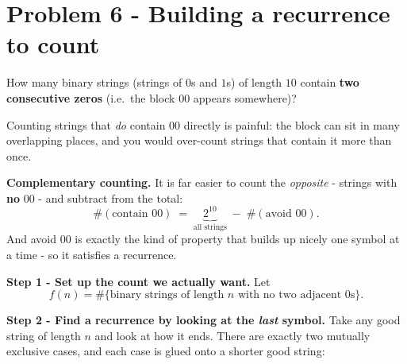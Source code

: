 \documentclass[11pt,a4paper]{article}
\begin{document}
\section*{Problem 6 - Building a recurrence to count}

\begin{problembox}[6]
How many binary strings (strings of $0$s and $1$s) of length $10$ contain
\textbf{two consecutive zeros} (i.e.\ the block \textquotedbl{}$00$\textquotedbl{} appears somewhere)?
\end{problembox}

\begin{ideabox}
Counting strings that \emph{do} contain \textquotedbl{}$00$\textquotedbl{} directly is painful: the block can sit in
many overlapping places, and you would over-count strings that contain it more than once.

\textbf{Complementary counting.} It is far easier to count the \emph{opposite} -
strings with \textbf{no} \textquotedbl{}$00$\textquotedbl{} - and subtract from the total:
\[
\#(\text{contain }00) \;=\; \underbrace{2^{10}}_{\text{all strings}} \;-\; \#(\text{avoid }00).
\]
And \textquotedbl{}avoid $00$\textquotedbl{} is exactly the kind of property that builds up nicely one symbol at a
time - so it satisfies a recurrence.
\end{ideabox}

\textbf{Step 1 - Set up the count we actually want.}
Let
\[
f(n) = \#\{\text{binary strings of length } n \text{ with no two adjacent } 0\text{s}\}.
\]

\textbf{Step 2 - Find a recurrence by looking at the \emph{last} symbol.}
Take any \textquotedbl{}good\textquotedbl{} string of length $n$ and look at how it ends. There are exactly two
mutually exclusive cases, and each case is glued onto a shorter good string:

\begin{center}
\end{center}
\end{document}
